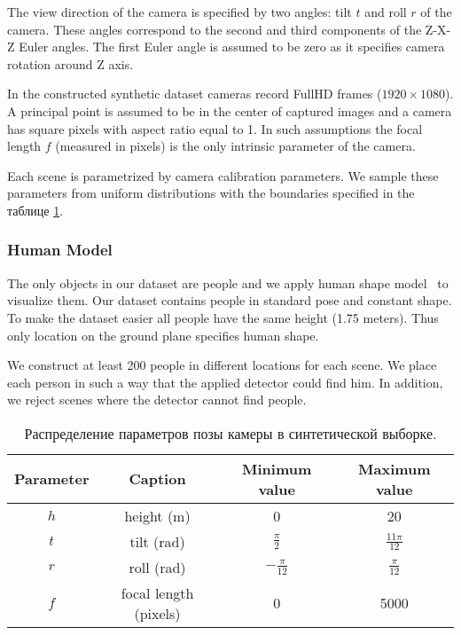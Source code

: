 The view direction of the camera is specified by two angles: tilt $t$ and roll $r$ of the camera. These angles correspond to the second and third components of the Z-X-Z Euler angles. The first Euler angle is assumed to be zero as it specifies camera rotation around Z axis.

In the constructed synthetic dataset cameras record FullHD frames ($1920\times1080$). A principal point is assumed to be in the center of captured images and a camera has square pixels with aspect ratio equal to 1. In such assumptions the focal length $f$ (measured in pixels) is the only intrinsic parameter of the camera.

Each scene is parametrized by camera calibration parameters. We sample these parameters from uniform distributions with the boundaries specified in the таблице \ref{tab:params}.

\subsubsection{Human Model}

\noindent The only objects in our dataset are people and we apply human shape model~\cite{pishchulin2015building} to visualize them. Our dataset contains people in standard pose and constant shape. To make the dataset easier all people have the same height (1.75 meters). Thus only location on the ground plane specifies human shape.

We construct at least 200 people in different locations for each scene. We place each person in such a way that the applied detector could find him. In addition, we reject scenes where the detector cannot find people.

\begin{table} [htbp]
	\centering
	\captionsetup{width=15cm}
	\caption{Распределение параметров позы камеры в синтетической выборке.}\label{tab:params}%
	\begin{tabular}{|c|c|c|c|}
		\hline
		Parameter & Caption & Minimum value & Maximum value\\
		\hline
		\hline
		$h$ & height (m) & 0 & 20 \\
		$t$ & tilt (rad) & $\frac{\pi}{2}$ & $\frac{11\pi}{12}$ \\
		$r$ & roll (rad) & $-\frac{\pi}{12}$ & $\frac{\pi}{12}$ \\
		$f$ & focal length (pixels) & 0 & 5000 \\
		\hline
	\end{tabular}
\end{table}

